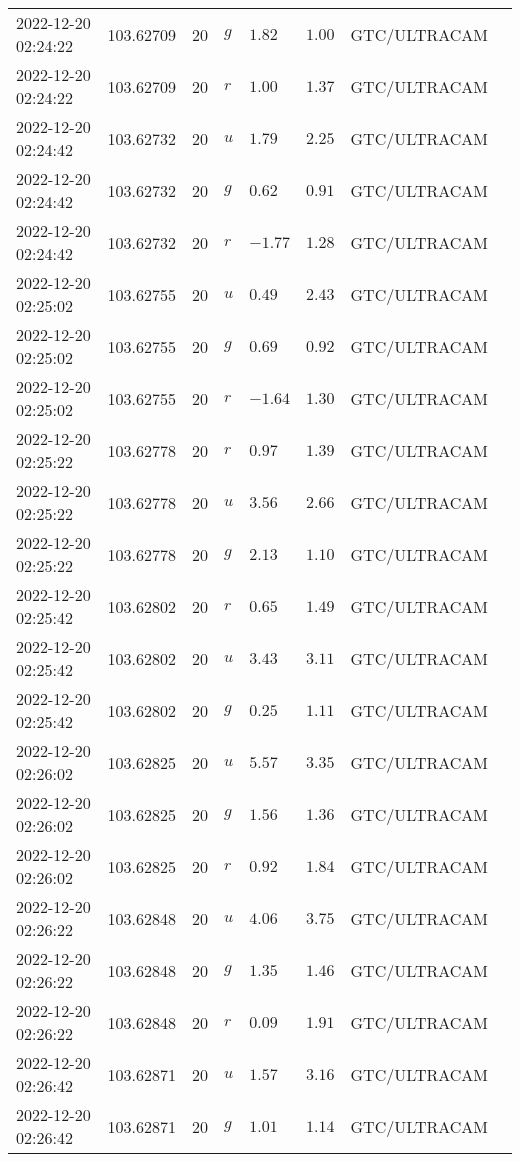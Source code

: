 \documentclass{nature_plusfigure}
\begin{document}
\begin{supplement}
\begin{center}
\begin{longtable}{llllllll}
2022-12-20 02:24:22 & 103.62709 & 20 & $g$ & $1.82$ & $1.00$ & GTC/ULTRACAM &  \\ 
2022-12-20 02:24:22 & 103.62709 & 20 & $r$ & $1.00$ & $1.37$ & GTC/ULTRACAM &  \\ 
2022-12-20 02:24:42 & 103.62732 & 20 & $u$ & $1.79$ & $2.25$ & GTC/ULTRACAM &  \\ 
2022-12-20 02:24:42 & 103.62732 & 20 & $g$ & $0.62$ & $0.91$ & GTC/ULTRACAM &  \\ 
2022-12-20 02:24:42 & 103.62732 & 20 & $r$ & $-1.77$ & $1.28$ & GTC/ULTRACAM &  \\ 
2022-12-20 02:25:02 & 103.62755 & 20 & $u$ & $0.49$ & $2.43$ & GTC/ULTRACAM &  \\ 
2022-12-20 02:25:02 & 103.62755 & 20 & $g$ & $0.69$ & $0.92$ & GTC/ULTRACAM &  \\ 
2022-12-20 02:25:02 & 103.62755 & 20 & $r$ & $-1.64$ & $1.30$ & GTC/ULTRACAM &  \\ 
2022-12-20 02:25:22 & 103.62778 & 20 & $r$ & $0.97$ & $1.39$ & GTC/ULTRACAM &  \\ 
2022-12-20 02:25:22 & 103.62778 & 20 & $u$ & $3.56$ & $2.66$ & GTC/ULTRACAM &  \\ 
2022-12-20 02:25:22 & 103.62778 & 20 & $g$ & $2.13$ & $1.10$ & GTC/ULTRACAM &  \\ 
2022-12-20 02:25:42 & 103.62802 & 20 & $r$ & $0.65$ & $1.49$ & GTC/ULTRACAM &  \\ 
2022-12-20 02:25:42 & 103.62802 & 20 & $u$ & $3.43$ & $3.11$ & GTC/ULTRACAM &  \\ 
2022-12-20 02:25:42 & 103.62802 & 20 & $g$ & $0.25$ & $1.11$ & GTC/ULTRACAM &  \\ 
2022-12-20 02:26:02 & 103.62825 & 20 & $u$ & $5.57$ & $3.35$ & GTC/ULTRACAM &  \\ 
2022-12-20 02:26:02 & 103.62825 & 20 & $g$ & $1.56$ & $1.36$ & GTC/ULTRACAM &  \\ 
2022-12-20 02:26:02 & 103.62825 & 20 & $r$ & $0.92$ & $1.84$ & GTC/ULTRACAM &  \\ 
2022-12-20 02:26:22 & 103.62848 & 20 & $u$ & $4.06$ & $3.75$ & GTC/ULTRACAM &  \\ 
2022-12-20 02:26:22 & 103.62848 & 20 & $g$ & $1.35$ & $1.46$ & GTC/ULTRACAM &  \\ 
2022-12-20 02:26:22 & 103.62848 & 20 & $r$ & $0.09$ & $1.91$ & GTC/ULTRACAM &  \\ 
2022-12-20 02:26:42 & 103.62871 & 20 & $u$ & $1.57$ & $3.16$ & GTC/ULTRACAM &  \\ 
2022-12-20 02:26:42 & 103.62871 & 20 & $g$ & $1.01$ & $1.14$ & GTC/ULTRACAM &  \\ 

\end{longtable}
\end{center}
\end{supplement}
\end{document}
